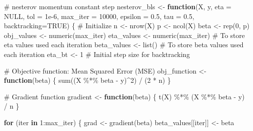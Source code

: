 \documentclass[
  letterpaper,
  DIV=11,
  numbers=noendperiod]{scrartcl}
\newenvironment{Shaded}{\begin{snugshade}}{\end{snugshade}}
\newcommand{\AttributeTok}[1]{\textcolor[rgb]{0.40,0.45,0.13}{#1}}
\newcommand{\CommentTok}[1]{\textcolor[rgb]{0.37,0.37,0.37}{#1}}
\newcommand{\ConstantTok}[1]{\textcolor[rgb]{0.56,0.35,0.01}{#1}}
\newcommand{\ControlFlowTok}[1]{\textcolor[rgb]{0.00,0.23,0.31}{\textbf{#1}}}
\newcommand{\DecValTok}[1]{\textcolor[rgb]{0.68,0.00,0.00}{#1}}
\newcommand{\FloatTok}[1]{\textcolor[rgb]{0.68,0.00,0.00}{#1}}
\newcommand{\FunctionTok}[1]{\textcolor[rgb]{0.28,0.35,0.67}{#1}}
\newcommand{\NormalTok}[1]{\textcolor[rgb]{0.00,0.23,0.31}{#1}}
\newcommand{\OtherTok}[1]{\textcolor[rgb]{0.00,0.23,0.31}{#1}}
\newcommand{\SpecialCharTok}[1]{\textcolor[rgb]{0.37,0.37,0.37}{#1}}
\begin{document}
\begin{Shaded}
\begin{Highlighting}[]
\CommentTok{\# nesterov momentum constant step}
\NormalTok{nesterov\_bls }\OtherTok{\textless{}{-}} \ControlFlowTok{function}\NormalTok{(X, y, }\AttributeTok{eta =} \ConstantTok{NULL}\NormalTok{, }\AttributeTok{tol =} \FloatTok{1e{-}6}\NormalTok{, }\AttributeTok{max\_iter =} \DecValTok{10000}\NormalTok{, }\AttributeTok{epsilon =} \FloatTok{0.5}\NormalTok{, }\AttributeTok{tau =} \FloatTok{0.5}\NormalTok{, }\AttributeTok{backtracking=}\ConstantTok{TRUE}\NormalTok{) \{}
  \CommentTok{\# Initialize}
\NormalTok{  n }\OtherTok{\textless{}{-}} \FunctionTok{nrow}\NormalTok{(X)}
\NormalTok{  p }\OtherTok{\textless{}{-}} \FunctionTok{ncol}\NormalTok{(X)}
\NormalTok{  beta }\OtherTok{\textless{}{-}} \FunctionTok{rep}\NormalTok{(}\DecValTok{0}\NormalTok{, p)}
\NormalTok{  obj\_values }\OtherTok{\textless{}{-}} \FunctionTok{numeric}\NormalTok{(max\_iter)}
\NormalTok{  eta\_values }\OtherTok{\textless{}{-}} \FunctionTok{numeric}\NormalTok{(max\_iter)  }\CommentTok{\# To store eta values used each iteration}
\NormalTok{  beta\_values }\OtherTok{\textless{}{-}} \FunctionTok{list}\NormalTok{() }\CommentTok{\# To store beta values used each iteration}
\NormalTok{  eta\_bt }\OtherTok{\textless{}{-}} \DecValTok{1}  \CommentTok{\# Initial step size for backtracking}
  
  \CommentTok{\# Objective function: Mean Squared Error (MSE)}
\NormalTok{  obj\_function }\OtherTok{\textless{}{-}} \ControlFlowTok{function}\NormalTok{(beta) \{}
    \FunctionTok{sum}\NormalTok{((X }\SpecialCharTok{\%*\%}\NormalTok{ beta }\SpecialCharTok{{-}}\NormalTok{ y)}\SpecialCharTok{\^{}}\DecValTok{2}\NormalTok{) }\SpecialCharTok{/}\NormalTok{ (}\DecValTok{2} \SpecialCharTok{*}\NormalTok{ n)}
\NormalTok{  \}}
  
  \CommentTok{\# Gradient function}
\NormalTok{  gradient }\OtherTok{\textless{}{-}} \ControlFlowTok{function}\NormalTok{(beta) \{}
    \FunctionTok{t}\NormalTok{(X) }\SpecialCharTok{\%*\%}\NormalTok{ (X }\SpecialCharTok{\%*\%}\NormalTok{ beta }\SpecialCharTok{{-}}\NormalTok{ y) }\SpecialCharTok{/}\NormalTok{ n}
\NormalTok{  \}}


  
  \ControlFlowTok{for}\NormalTok{ (iter }\ControlFlowTok{in} \DecValTok{1}\SpecialCharTok{:}\NormalTok{max\_iter) \{}
\NormalTok{    grad }\OtherTok{\textless{}{-}} \FunctionTok{gradient}\NormalTok{(beta)}
\NormalTok{    beta\_values[[iter]] }\OtherTok{\textless{}{-}}\NormalTok{ beta}
    

\end{Highlighting}
\end{Shaded}
\end{document}
